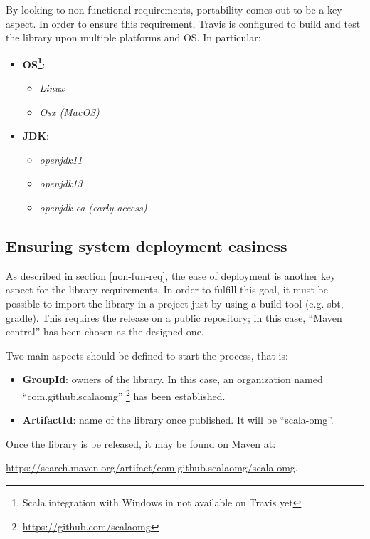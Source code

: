 By looking to non functional requirements, portability comes out to be a key aspect. In order to ensure this requirement, Travis is configured to build and test the library upon multiple platforms and OS. In particular:
\begin{itemize}
\item \textbf{OS\footnote{Scala integration with Windows in not available on Travis yet}}: 
  \begin{itemize}
  \item \textit{Linux}
  \item \textit{Osx (MacOS)}
  \end{itemize}
\item \textbf{JDK}:
  \begin{itemize}
  \item \textit{openjdk11}
  \item \textit{openjdk13}
  \item \textit{openjdk-ea (early access)}
  \end{itemize} 
\end{itemize}  

\subsection{Ensuring system deployment easiness}

As described in section \ref{non-fun-req}, the ease of deployment is another key aspect for the library requirements. In order to fulfill this goal, it must be possible to import the library in a project just by using a build tool (e.g. sbt, gradle). This requires the release on a public repository; in this case, ``Maven central'' has been chosen as the designed one.

Two main aspects should be defined to start the process, that is:
\begin{itemize}
  \item \textbf{GroupId}: owners of the library. In this case, an organization named ``com.github.scalaomg'' \footnote{ \url{https://github.com/scalaomg}} has been established.
  \item \textbf{ArtifactId}: name of the library once published. It will be ``scala-omg''.
\end{itemize}

Once the library is be released, it may be found on Maven at: 

\begin{center}
\url{https://search.maven.org/artifact/com.github.scalaomg/scala-omg}.
\end{center}


